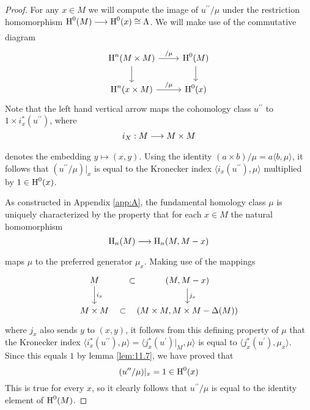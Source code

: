 \documentclass[../main]{subfiles}
\begin{document}
\begin{proof} For any $x \in M$ we will compute the image of $u^{\prime \prime} / \mu$ under the restriction homomorphism $\homology^{0}(M) \varrightarrow{} \homology^{0}(x) \cong \Lambda$. We will make use of the commutative diagram
\[\begin{tikzcd}
\homology^n(M\times M) \arrow[r,"/\mu"] \arrow[d] & \homology^0(M)\arrow[d]\\ \homology^n(x\times M) \arrow[r, "/\mu"]& \homology^0(x)
\end{tikzcd}\]
Note that the left hand vertical arrow maps the cohomology class $u^{\prime \prime}$ to $1 \times i_{x}^{*}(u^{\prime \prime})$, where
\[
i_{X}: M \varrightarrow{} M \times M
\]
denotes the embedding $y \mapsto(x, y)$. Using the identity $(a \times b) / \mu=a\langle b, \mu\rangle$, it follows that $(u^{\prime \prime} / \mu) |_x$ is equal to the Kronecker index $\langle i_{x}(u^{\prime \prime}), \mu\rangle$ multiplied by $1 \in \operatorname{H}^{0}(x)$.

As constructed in Appendix \ref{app:A}, the fundamental homology class $\mu$ is uniquely characterized by the property that for each $x \in M$ the natural homomorphism
\[
\homology_{n}(M) \varrightarrow{} \homology_{n}(M, M-x)
\]
maps $\mu$ to the preferred generator $\mu_{x}$. Making use of the mappings
\[\begin{tikzcd}
M \arrow[r,phantom , "\subset"]\arrow[d,"i_x"] &(M,M-x)\arrow[d,"j_x"]\\ M\times M \arrow[r,phantom, "\subset"] &(M\times M, M\times M -\Delta(M))
\end{tikzcd}\]
where $j_{x}$ also sends $y$ to $(x, y)$, it follows from this defining property of $\mu$ that the Kronecker index $\langle i_{x}^{*}(u^{\prime \prime}), \mu\rangle=\langle j_{x}^{*}(u^{\prime})|_M, \mu\rangle$ is equal to $\langle j_{x}^{*}(u^{\prime}), \mu_{x}\rangle$. Since this equals $1$ by lemma \ref{lem:11.7}, we have proved that
\[
(u^{\prime \prime} / \mu)|_x=1 \in \operatorname{H}^{0}(x)
\]
This is true for every $x$, so it clearly follows that $u^{\prime \prime} / \mu$ is equal to the identity element of $\operatorname{H}^{0}(M)$.
\end{proof}
\end{document}
